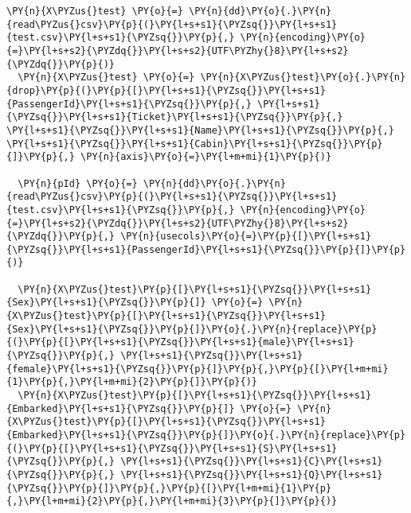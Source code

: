       \begin{tcolorbox}[breakable, size=fbox, boxrule=1pt, pad at break*=1mm,colback=cellbackground, colframe=cellborder]
  \begin{Verbatim}[commandchars=\\\{\}]
  \PY{n}{X\PYZus{}test} \PY{o}{=} \PY{n}{dd}\PY{o}{.}\PY{n}{read\PYZus{}csv}\PY{p}{(}\PY{l+s+s1}{\PYZsq{}}\PY{l+s+s1}{test.csv}\PY{l+s+s1}{\PYZsq{}}\PY{p}{,} \PY{n}{encoding}\PY{o}{=}\PY{l+s+s2}{\PYZdq{}}\PY{l+s+s2}{UTF\PYZhy{}8}\PY{l+s+s2}{\PYZdq{}}\PY{p}{)}
  \PY{n}{X\PYZus{}test} \PY{o}{=} \PY{n}{X\PYZus{}test}\PY{o}{.}\PY{n}{drop}\PY{p}{(}\PY{p}{[}\PY{l+s+s1}{\PYZsq{}}\PY{l+s+s1}{PassengerId}\PY{l+s+s1}{\PYZsq{}}\PY{p}{,} \PY{l+s+s1}{\PYZsq{}}\PY{l+s+s1}{Ticket}\PY{l+s+s1}{\PYZsq{}}\PY{p}{,} \PY{l+s+s1}{\PYZsq{}}\PY{l+s+s1}{Name}\PY{l+s+s1}{\PYZsq{}}\PY{p}{,} \PY{l+s+s1}{\PYZsq{}}\PY{l+s+s1}{Cabin}\PY{l+s+s1}{\PYZsq{}}\PY{p}{]}\PY{p}{,} \PY{n}{axis}\PY{o}{=}\PY{l+m+mi}{1}\PY{p}{)}

  \PY{n}{pId} \PY{o}{=} \PY{n}{dd}\PY{o}{.}\PY{n}{read\PYZus{}csv}\PY{p}{(}\PY{l+s+s1}{\PYZsq{}}\PY{l+s+s1}{test.csv}\PY{l+s+s1}{\PYZsq{}}\PY{p}{,} \PY{n}{encoding}\PY{o}{=}\PY{l+s+s2}{\PYZdq{}}\PY{l+s+s2}{UTF\PYZhy{}8}\PY{l+s+s2}{\PYZdq{}}\PY{p}{,} \PY{n}{usecols}\PY{o}{=}\PY{p}{[}\PY{l+s+s1}{\PYZsq{}}\PY{l+s+s1}{PassengerId}\PY{l+s+s1}{\PYZsq{}}\PY{p}{]}\PY{p}{)}

  \PY{n}{X\PYZus{}test}\PY{p}{[}\PY{l+s+s1}{\PYZsq{}}\PY{l+s+s1}{Sex}\PY{l+s+s1}{\PYZsq{}}\PY{p}{]} \PY{o}{=} \PY{n}{X\PYZus{}test}\PY{p}{[}\PY{l+s+s1}{\PYZsq{}}\PY{l+s+s1}{Sex}\PY{l+s+s1}{\PYZsq{}}\PY{p}{]}\PY{o}{.}\PY{n}{replace}\PY{p}{(}\PY{p}{[}\PY{l+s+s1}{\PYZsq{}}\PY{l+s+s1}{male}\PY{l+s+s1}{\PYZsq{}}\PY{p}{,} \PY{l+s+s1}{\PYZsq{}}\PY{l+s+s1}{female}\PY{l+s+s1}{\PYZsq{}}\PY{p}{]}\PY{p}{,}\PY{p}{[}\PY{l+m+mi}{1}\PY{p}{,}\PY{l+m+mi}{2}\PY{p}{]}\PY{p}{)}
  \PY{n}{X\PYZus{}test}\PY{p}{[}\PY{l+s+s1}{\PYZsq{}}\PY{l+s+s1}{Embarked}\PY{l+s+s1}{\PYZsq{}}\PY{p}{]} \PY{o}{=} \PY{n}{X\PYZus{}test}\PY{p}{[}\PY{l+s+s1}{\PYZsq{}}\PY{l+s+s1}{Embarked}\PY{l+s+s1}{\PYZsq{}}\PY{p}{]}\PY{o}{.}\PY{n}{replace}\PY{p}{(}\PY{p}{[}\PY{l+s+s1}{\PYZsq{}}\PY{l+s+s1}{S}\PY{l+s+s1}{\PYZsq{}}\PY{p}{,} \PY{l+s+s1}{\PYZsq{}}\PY{l+s+s1}{C}\PY{l+s+s1}{\PYZsq{}}\PY{p}{,} \PY{l+s+s1}{\PYZsq{}}\PY{l+s+s1}{Q}\PY{l+s+s1}{\PYZsq{}}\PY{p}{]}\PY{p}{,}\PY{p}{[}\PY{l+m+mi}{1}\PY{p}{,}\PY{l+m+mi}{2}\PY{p}{,}\PY{l+m+mi}{3}\PY{p}{]}\PY{p}{)}
  \end{Verbatim}
  \end{tcolorbox}

